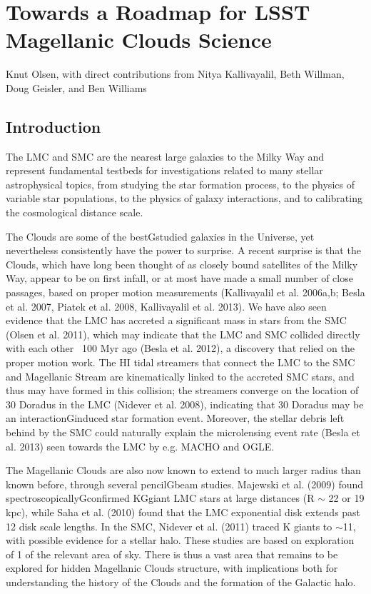 \section{Towards a Roadmap for LSST Magellanic Clouds Science}
Knut Olsen, with direct contributions from Nitya Kallivayalil, Beth Willman, Doug  Geisler, and Ben Williams  

\subsection{Introduction} 
The LMC and SMC are the nearest large galaxies to the Milky Way and represent  fundamental testbeds for investigations related to many stellar astrophysical topics,  from studying the star formation process, to the physics of variable star populations,  to the physics of galaxy interactions, and to calibrating the cosmological distance  scale.    

The Clouds are some of the bestGstudied galaxies in the Universe, yet nevertheless  consistently have the power to surprise.  A recent surprise is that the Clouds, which  have long been thought of as closely bound satellites of the Milky Way, appear to be  on first infall, or at most have made a small number of close passages, based on  proper motion measurements (Kallivayalil et al. 2006a,b; Besla et al. 2007, Piatek et  al. 2008, Kallivayalil et al. 2013).  We have also seen evidence that the LMC has  accreted a significant mass in stars from the SMC (Olsen et al. 2011), which may  indicate that the LMC and SMC collided directly with each other ~100 Myr ago  (Besla et al. 2012), a discovery that relied on the proper motion work.  The HI tidal  streamers that connect the LMC to the SMC and Magellanic Stream are kinematically  linked to the accreted SMC stars, and thus may have formed in this collision; the  streamers converge on the location of 30 Doradus in the LMC (Nidever et al. 2008),  indicating that 30 Doradus may be an interactionGinduced star formation event.   Moreover, the stellar debris left behind by the SMC could naturally explain the  microlensing event rate (Besla et al. 2013) seen towards the LMC by e.g. MACHO and  OGLE.  

The Magellanic Clouds are also now known to extend to much larger radius than  known before, through several pencilGbeam studies.  Majewski et al. (2009) found  spectroscopicallyGconfirmed KGgiant LMC stars at large distances (R $\sim$ 22 or 19 kpc),  while Saha et al. (2010) found that the LMC exponential disk extends past 12 disk  scale lengths.  In the SMC, Nidever et al. (2011) traced K giants to $\sim$11, with  possible evidence for a stellar halo.  These studies are based on exploration of 1  of the relevant area of sky.  There is thus a vast area that remains to be explored for  hidden Magellanic Clouds structure, with implications both for understanding the  history of the Clouds and the formation of the Galactic halo.   

